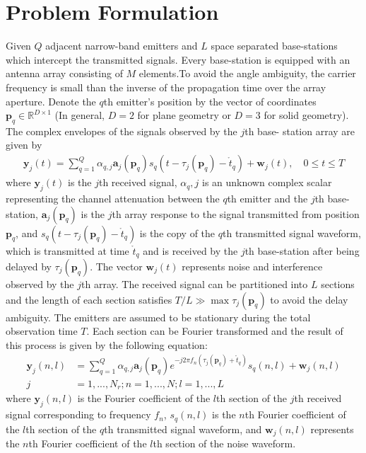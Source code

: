 \documentclass[review]{elsarticle}
\begin{document}
\section{Problem Formulation}
Given $Q$ adjacent narrow-band emitters and $L$ space separated base-stations which intercept the transmitted signals. Every base-station is equipped with an antenna array consisting of $M$ elements.To avoid the angle ambiguity, the carrier frequency is small than the inverse of the propagation time over the array aperture. Denote the $q$th emitter’s position by the vector of coordinates $\boldsymbol{p}_q\in \mathbb{R}^{D\times 1}$ (In general, $D=2$ for plane geometry or $D=3$ for solid geometry). The complex envelopes of the signals observed by the $j$th base-
station array are given by
\begin{align}\label{yjt}
\boldsymbol{y}_j(t)=\sum_{q=1}^Q\alpha_{q,j}\boldsymbol{a}_j(\boldsymbol{p}_q)s_q(t-\tau_j(\boldsymbol{p}_q)-\mathring{t}_q)+\boldsymbol{w}_{j}(t),\quad 0\leq t\leq T
\end{align}
where $\boldsymbol{y}_j(t)$ is the $j$th received signal, $\alpha_q,j$ is an unknown complex scalar representing the channel attenuation between the $q$th emitter and the $j$th base-station, $\boldsymbol{a}_j(\boldsymbol{p}_q)$ is the $j$th array response to the signal transmitted from position $\boldsymbol{p}_q$, and $s_q(t-\tau_j(\boldsymbol{p}_q)-\mathring{t}_q)$ is the copy of the $q$th transmitted signal waveform, which is transmitted at time $\mathring{t}_q$ and is received by the $j$th base-station after being delayed by $\tau_j(\boldsymbol{p}_q)$. The vector $\boldsymbol{w}_j(t)$ represents noise and interference observed by the $j$th array. The received signal can be partitioned into $L$ sections and the length of each section satisfies $T/L\gg \max{\tau_j(\boldsymbol{p}_q)}$ to avoid the delay ambiguity. The emitters are assumed to be stationary during the total observation time $T$. Each section can be Fourier transformed and the result of this process is given by the following equation:
\begin{align}\label{yjnl}
    \boldsymbol{y}_j(n,l)&=\sum_{q=1}^Q\alpha_{q,j}\boldsymbol{a}_j(\boldsymbol{p}_q)e^{-j2\pi f_n(\tau_j(\boldsymbol{p}_q)+\mathring{t}_q)}s_q(n,l)+\boldsymbol{w}_j(n,l)\\ \nonumber
    j&=1,...,N_r;n=1,...,N;l=1,...,L
\end{align}
where $\boldsymbol{y}_j(n,l)$ is the Fourier coefficient of the $l$th section of the $j$th received signal corresponding to frequency $f_n$, $s_q(n,l)$ is the $n$th Fourier coefficient of the $l$th section of the $q$th transmitted signal waveform, and $\boldsymbol{w}_j(n,l)$ represents the $n$th Fourier coefficient of the $l$th section of the noise waveform.
\end{document}
